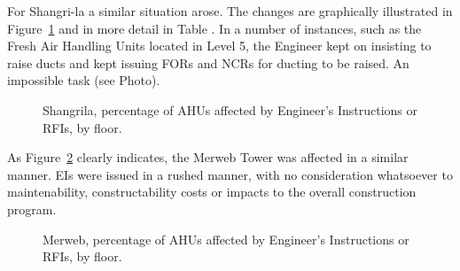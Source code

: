 For Shangri-la a similar situation arose. The changes are graphically illustrated in Figure~\ref{fig:SLAHUs} and in more detail in Table . In a number of instances, such as the Fresh Air Handling Units located in Level 5, the Engineer kept on insisting to raise ducts and kept issuing FORs and NCRs for ducting to be raised. An impossible task (see Photo).

\begin{figure}[htbp]
\centering
{}
\caption{Shangrila, percentage of AHUs affected by Engineer's 
Instructions or RFIs, by floor.}
\label{fig:SLAHUs}
\end{figure}


As Figure~\ref{fig:MWAHUs} clearly indicates, the Merweb Tower was affected in a similar manner. EIs were issued in a rushed manner, with no consideration whatsoever to maintenability, constructability costs or impacts to the overall construction program.

\begin{figure}[htbp]
\centering
{}
\caption{Merweb, percentage of AHUs affected by Engineer's 
Instructions or RFIs, by floor.}
\label{fig:MWAHUs}
\end{figure}



